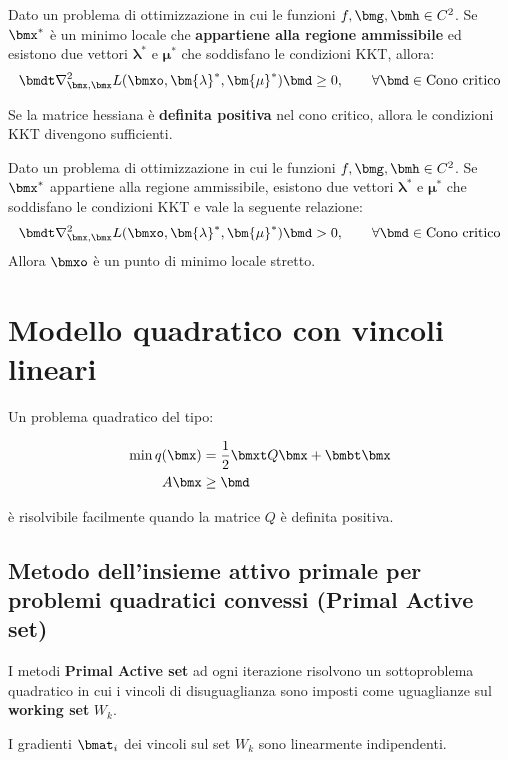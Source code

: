 \documentclass[\main/main.tex]{subfiles}
\begin{document}
\begin{theorem}
	Dato un problema di ottimizzazione in cui le funzioni \(f, \bmg, \bmh \in C^2\). Se \(\bmx^*\) è un minimo locale che \textbf{appartiene alla regione ammissibile} ed esistono due vettori \(\bm{\lambda}^*\) e \(\bm{\mu}^*\) che soddisfano le condizioni KKT, allora:
	\[
		\bmdt \nabla^2_{\bmx, \bmx} L(\bmxo, \bm{\lambda}^*, \bm{\mu}^*)\bmd \geq 0, \qquad \forall \bmd \in \text{Cono critico}
	\]
\end{theorem}

Se la matrice hessiana è \textbf{definita positiva} nel cono critico, allora le condizioni KKT divengono sufficienti.

\begin{theorem}
	Dato un problema di ottimizzazione in cui le funzioni \(f, \bmg, \bmh \in C^2\). Se \(\bmx^*\) appartiene alla regione ammissibile, esistono due vettori \(\bm{\lambda}^*\) e \(\bm{\mu}^*\) che soddisfano le condizioni KKT e vale la seguente relazione:
	\[
		\bmdt \nabla^2_{\bmx, \bmx} L(\bmxo, \bm{\lambda}^*, \bm{\mu}^*)\bmd > 0, \qquad \forall \bmd \in \text{Cono critico}
	\]
	Allora \(\bmxo \) è un punto di minimo locale stretto.
\end{theorem}

\section{Modello quadratico con vincoli lineari}
Un problema quadratico del tipo:

\begin{align*}
	\min q(\bmx) &= \frac{1}{2} \bmxt Q \bmx + \bmbt \bmx \\
	A\bmx &\geq \bmd
\end{align*}

è risolvibile facilmente quando la matrice \(Q\) è definita positiva.

\subsection{Metodo dell'insieme attivo primale per problemi quadratici convessi (Primal Active set)}
I metodi \textbf{Primal Active set} ad ogni iterazione risolvono un sottoproblema quadratico in cui i vincoli di disuguaglianza sono imposti come uguaglianze sul \textbf{working set} \(W_k\).

I gradienti \(\bmat_i\) dei vincoli sul set \(W_k\) sono linearmente indipendenti.
\end{document}
